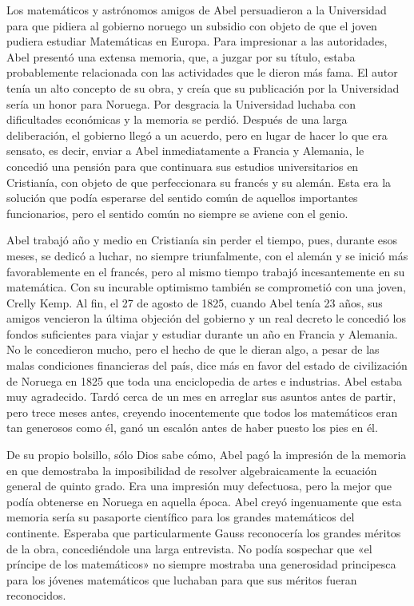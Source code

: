 \documentclass[a4paper, 12pt, draft]{article}
\begin{document}
Los matemáticos y astrónomos amigos de Abel persuadieron a la Universidad para que pidiera al gobierno noruego un subsidio con objeto de que el joven pudiera estudiar Matemáticas en Europa. Para impresionar a las autoridades, Abel presentó una extensa memoria, que, a juzgar por su título, estaba probablemente relacionada con las actividades que le dieron más fama. El autor tenía un alto concepto de su obra, y creía que su publicación por la Universidad sería un honor para Noruega. Por desgracia la Universidad luchaba con dificultades económicas y la memoria se perdió. Después de una larga deliberación, el gobierno llegó a un acuerdo, pero en lugar de hacer lo que era sensato, es decir, enviar a Abel inmediatamente a Francia y Alemania, le concedió una pensión para que continuara sus estudios universitarios en Cristianía, con objeto de que perfeccionara su francés y su alemán. Esta era la solución que podía esperarse del sentido común de aquellos importantes funcionarios, pero el sentido común no siempre se aviene con el genio.

Abel trabajó año y medio en Cristianía sin perder el tiempo, pues, durante esos meses, se dedicó a luchar, no siempre triunfalmente, con el alemán y se inició más favorablemente en el francés, pero al mismo tiempo trabajó incesantemente en su matemática. Con su incurable optimismo también se comprometió con una joven, Crelly Kemp. Al fin, el 27 de agosto de 1825, cuando Abel tenía 23 años, sus amigos vencieron la última objeción del gobierno y un real decreto le concedió los fondos suficientes para viajar y estudiar durante un año en Francia y Alemania. No le concedieron mucho, pero el hecho de que le dieran algo, a pesar de las malas condiciones financieras del país, dice más en favor del estado de civilización de Noruega en 1825 que toda una enciclopedia de artes e industrias. Abel estaba muy agradecido. Tardó cerca de un mes en arreglar sus asuntos antes de partir, pero trece meses antes, creyendo inocentemente que todos los matemáticos eran tan generosos como él, ganó un escalón antes de haber puesto los pies en él.

De su propio bolsillo, sólo Dios sabe cómo, Abel pagó la impresión de la memoria en que demostraba la imposibilidad de resolver algebraicamente la ecuación general de quinto grado. Era una impresión muy defectuosa, pero la mejor que podía obtenerse en Noruega en aquella época. Abel creyó ingenuamente que esta memoria sería su pasaporte científico para los grandes matemáticos del continente. Esperaba que particularmente Gauss reconocería los grandes méritos de la obra, concediéndole una larga entrevista. No podía sospechar que «el príncipe de los matemáticos» no siempre mostraba una generosidad principesca para los jóvenes matemáticos que luchaban para que sus méritos fueran reconocidos.
\end{document}
